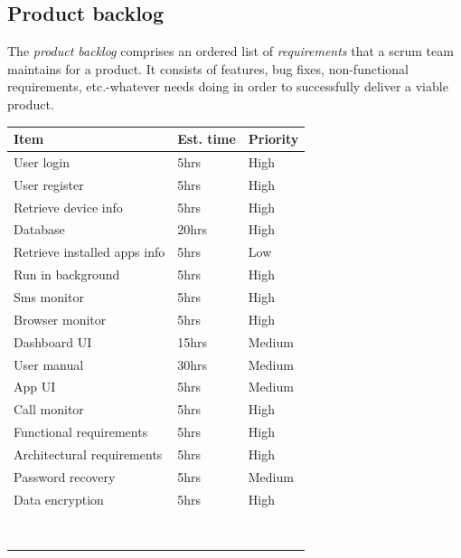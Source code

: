 \documentclass[hidelinks, 12pt, oneside]{article}
\begin{document}
 	\subsection{Product backlog}
 	The \emph{product backlog} comprises an ordered list of \emph{requirements} that a scrum team maintains for a product. It consists of features, bug fixes, non-functional 
 	requirements, etc.-whatever needs doing in order to successfully deliver a viable product.\newline\newline 	
 	\begin{tabular}{|p{6cm}|p{4cm}|p{3cm}|}
			\textbf{Item} & \textbf{Est. time} & \textbf{Priority}\\
			\hline
			User login & 5hrs & High\\
			\hline
			User register & 5hrs & High\\
			\hline
			Retrieve device info & 5hrs & High\\
			\hline
			Database & 20hrs & High\\
			\hline
			Retrieve installed apps info & 5hrs & Low\\
			\hline
			Run in background & 5hrs & High\\
			\hline
			Sms monitor & 5hrs & High\\
			\hline
			Browser monitor & 5hrs & High\\
			\hline
			Dashboard UI & 15hrs & Medium\\
			\hline
			User manual & 30hrs & Medium\\
			\hline
			App UI & 5hrs & Medium\\
			\hline
			Call monitor & 5hrs & High\\
			\hline
			Functional requirements & 5hrs & High\\
			\hline
			Architectural requirements & 5hrs & High\\
			\hline
			Password recovery & 5hrs & Medium\\
			\hline
			Data encryption & 5hrs & High\\
			\hline
			&&\\
			\hline
			&&\\
			\hline
			&&\\
			\hline
			&&\\
			\hline
			&&\\
			\hline
			&&\\
			\hline
			&&\\
			\hline
			&&\\
			\hline
		\end{tabular}\newpage
		
\end{document}

